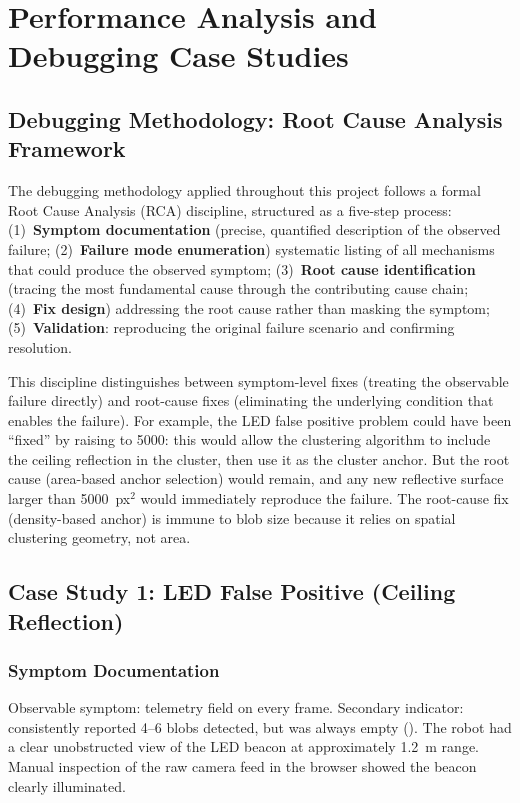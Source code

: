 \chapter{Performance Analysis and Debugging Case Studies}
\label{ch:results}

\section{Debugging Methodology: Root Cause Analysis Framework}

The debugging methodology applied throughout this project follows a formal Root Cause Analysis (RCA) discipline, structured as a five-step process: (1)~\textbf{Symptom documentation} (precise, quantified description of the observed failure; (2)~\textbf{Failure mode enumeration}) systematic listing of all mechanisms that could produce the observed symptom; (3)~\textbf{Root cause identification} (tracing the most fundamental cause through the contributing cause chain; (4)~\textbf{Fix design}) addressing the root cause rather than masking the symptom; (5)~\textbf{Validation}: reproducing the original failure scenario and confirming resolution.

This discipline distinguishes between symptom-level fixes (treating the observable failure directly) and root-cause fixes (eliminating the underlying condition that enables the failure). For example, the LED false positive problem could have been ``fixed'' by raising  to 5000: this would allow the clustering algorithm to include the ceiling reflection in the cluster, then use it as the cluster anchor. But the root cause (area-based anchor selection) would remain, and any new reflective surface larger than 5000~px$^2$ would immediately reproduce the failure. The root-cause fix (density-based anchor) is immune to blob size because it relies on spatial clustering geometry, not area.

\section{Case Study 1: LED False Positive (Ceiling Reflection)}

\subsection{Symptom Documentation}

Observable symptom: telemetry field  on every frame. Secondary indicator:  consistently reported 4--6 blobs detected, but  was always empty (). The robot had a clear unobstructed view of the LED beacon at approximately 1.2~m range. Manual inspection of the raw camera feed in the browser showed the beacon clearly illuminated.

